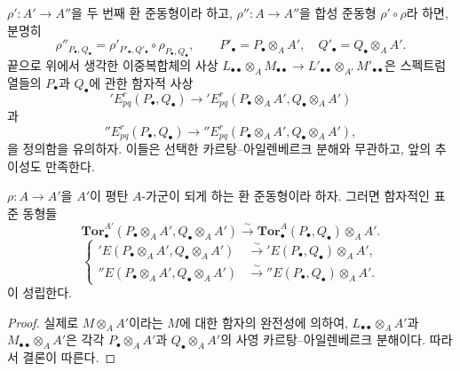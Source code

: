 \begin{env}[6.3.8]
$\rho':A'\to A''$을 두 번째 환 준동형이라 하고,
$\rho'':A\to A''$을 합성 준동형 $\rho'\circ\rho$라 하면, 분명히
\[
  \rho''_{P_\bullet,Q_\bullet}
  =\rho'_{P'_\bullet,Q'_\bullet}\circ\rho_{P_\bullet,Q_\bullet},
  \qquad
  P'_\bullet=P_\bullet\otimes_A A',
  \quad Q'_\bullet=Q_\bullet\otimes_A A'.
\]
끝으로 위에서 생각한 이중복합체의 사상
$L_{\bullet\bullet}\otimes_A M_{\bullet\bullet}
\to L'_{\bullet\bullet}\otimes_{A'}M'_{\bullet\bullet}$은 스펙트럼
열들의 $P_\bullet$과 $Q_\bullet$에 관한 함자적 사상
\[
  'E_{pq}^r(P_\bullet,Q_\bullet)
  \longrightarrow
  'E_{pq}^r(P_\bullet\otimes_A A',Q_\bullet\otimes_A A')
\]
과
\[
  ''E_{pq}^r(P_\bullet,Q_\bullet)
  \longrightarrow
  ''E_{pq}^r(P_\bullet\otimes_A A',Q_\bullet\otimes_A A'),
\]
을 정의함을 유의하자. 이들은 선택한 카르탕--아일렌베르크 분해와
무관하고, 앞의 추이성도 만족한다.
\end{env}

\begin{proposition}[6.3.9]
\label{III.6.3.9-fr}
$\rho:A\to A'$을 $A'$이 평탄 $A$-가군이 되게 하는 환 준동형이라
하자. 그러면 함자적인 표준 동형들
\[
  \mathbf{Tor}_\bullet^{A'}
  (P_\bullet\otimes_A A',Q_\bullet\otimes_A A')
  \xrightarrow{\sim}
  \mathbf{Tor}_\bullet^A(P_\bullet,Q_\bullet)\otimes_A A'.
  \tag{6.3.9.1}\label{III.6.3.9.1.fr}
\]
\[
  \left\{
  \begin{aligned}
  'E(P_\bullet\otimes_A A',Q_\bullet\otimes_A A')
    &\xrightarrow{\sim}'E(P_\bullet,Q_\bullet)\otimes_A A',\\
  ''E(P_\bullet\otimes_A A',Q_\bullet\otimes_A A')
    &\xrightarrow{\sim}''E(P_\bullet,Q_\bullet)\otimes_A A'.
  \end{aligned}
  \right.
  \tag{6.3.9.2}\label{III.6.3.9.2.fr}
\]
이 성립한다.
\end{proposition}

\begin{proof}
실제로 $M\otimes_A A'$이라는 $M$에 대한 함자의 완전성에 의하여,
$L_{\bullet\bullet}\otimes_A A'$과
$M_{\bullet\bullet}\otimes_A A'$은 각각
$P_\bullet\otimes_A A'$과 $Q_\bullet\otimes_A A'$의 사영
카르탕--아일렌베르크 분해이다. 따라서 결론이 따른다.
\end{proof}

